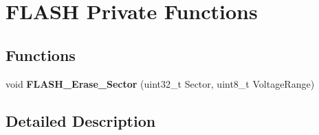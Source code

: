 \hypertarget{group___f_l_a_s_h_ex___private___functions}{}\section{F\+L\+A\+SH Private Functions}
\label{group___f_l_a_s_h_ex___private___functions}
\subsection*{Functions}
\begin{DoxyCompactItemize}
\item 
void {\bfseries F\+L\+A\+S\+H\+\_\+\+Erase\+\_\+\+Sector} (uint32\+\_\+t Sector, uint8\+\_\+t Voltage\+Range)\hypertarget{group___f_l_a_s_h_ex___private___functions_ga98c9d95cedcc4bfd39cdee82d07c0792}{}\label{group___f_l_a_s_h_ex___private___functions_ga98c9d95cedcc4bfd39cdee82d07c0792}

\end{DoxyCompactItemize}


\subsection{Detailed Description}

